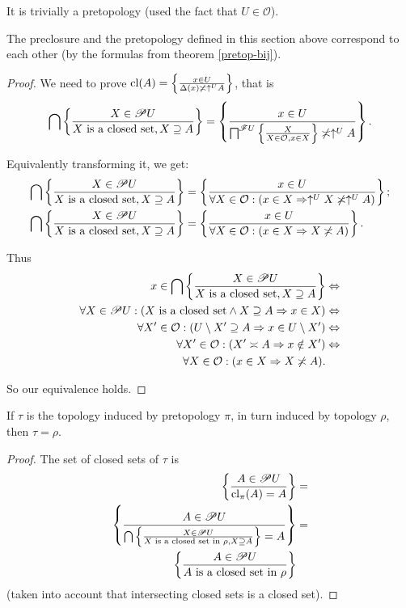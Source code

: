 It is trivially a pretopology (used the fact that $U\in\mathcal{O}$).
\begin{prop}
The preclosure and the pretopology defined in this section above correspond
to each other (by the formulas from theorem \ref{pretop-bij}).\end{prop}
\begin{proof}
We need to prove $\operatorname{cl}(A)=\left\{ \frac{x\in U}{\Delta(x)\not\asymp\uparrow^{U}A}\right\}$,
that is
\[
\bigcap\left\{ \frac{X\in\mathscr{P} U}{X\text{ is a closed set},X\supseteq A}\right\}=\left\{ \frac{x\in U}{\bigsqcap^{\mathscr{F}U}\left\{ \frac{X}{X\in\mathcal{O},x\in X}\right\}\not\asymp\uparrow^{U}A}\right\}.
\]


Equivalently transforming it, we get:
\begin{align*}
\bigcap\left\{ \frac{X\in\mathscr{P} U}{X\text{ is a closed set},X\supseteq A}\right\} & =\left\{ \frac{x\in U}{\forall X\in\mathcal{O}:(x\in X\Rightarrow\uparrow^{U}X\not\asymp\uparrow^{U}A)}\right\};\\
\bigcap\left\{ \frac{X\in\mathscr{P} U}{X\text{ is a closed set},X\supseteq A}\right\} & =\left\{ \frac{x\in U}{\forall X\in\mathcal{O}:(x\in X\Rightarrow X\not\asymp A)}\right\}.
\end{align*}


Thus
\begin{align*}
x\in\bigcap\left\{ \frac{X\in\mathscr{P} U}{X\text{ is a closed set},X\supseteq A}\right\} & \Leftrightarrow\\
\forall X\in\mathscr{P} U:(X\text{ is a closed set}\land X\supseteq A\Rightarrow x\in X) & \Leftrightarrow\\
\forall X'\in\mathcal{O}:(U\setminus X'\supseteq A\Rightarrow x\in U\setminus X') & \Leftrightarrow\\
\forall X'\in\mathcal{O}:(X'\asymp A\Rightarrow x\notin X') & \Leftrightarrow\\
\forall X\in\mathcal{O}:(x\in X\Rightarrow X\not\asymp A).
\end{align*}


So our equivalence holds.\end{proof}
\begin{prop}
If $\tau$ is the topology induced by pretopology $\pi$, in turn
induced by topology $\rho$, then $\tau=\rho$.\end{prop}
\begin{proof}
The set of closed sets of $\tau$ is
\begin{align*}
\left\{ \frac{A\in\mathscr{P} U}{\operatorname{cl}_{\pi}(A)=A}\right\} & =\\
\left\{ \frac{A\in\mathscr{P} U}{\bigcap\left\{ \frac{X\in\mathscr{P} U}{X\text{ is a closed set in }\rho,X\supseteq A}\right\}=A}\right\} & =\\
\left\{ \frac{A\in\mathscr{P} U}{A\text{ is a closed set in }\rho}\right\}
\end{align*}
(taken into account that intersecting closed sets is a closed set).\end{proof}
